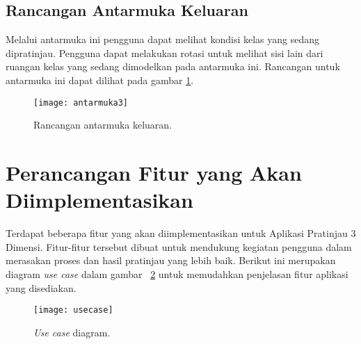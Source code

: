 \subsection{Rancangan Antarmuka Keluaran}
\label{sec:antarmukakeluaran}
Melalui antarmuka ini pengguna dapat melihat kondisi kelas yang sedang dipratinjau. Pengguna dapat melakukan rotasi untuk melihat sisi lain dari ruangan kelas yang sedang dimodelkan pada antarmuka ini. Rancangan untuk antarmuka ini dapat dilihat pada gambar \ref{fig:antarmuka3}.
\begin{figure}[ht]
	\centering
	\texttt{[image: antarmuka3]}
	\caption{Rancangan antarmuka keluaran.}
	\label{fig:antarmuka3}
	\vspace{8mm}
\end{figure}

\section{Perancangan Fitur yang Akan Diimplementasikan}
\label{sec:rancanganfitur}
Terdapat beberapa fitur yang akan diimplementasikan untuk Aplikasi Pratinjau 3 Dimensi. Fitur-fitur tersebut dibuat untuk mendukung kegiatan pengguna dalam merasakan proses dan hasil pratinjau yang lebih baik. Berikut ini merupakan diagram {\it use case} dalam gambar ~\ref{fig:usecase} untuk memudahkan penjelasan fitur aplikasi yang disediakan.
\begin{figure}[H]
	\centering
	\texttt{[image: usecase]}
	\caption{{\it Use case} diagram.}
	\label{fig:usecase}
	\vspace{8mm}
\end{figure}

